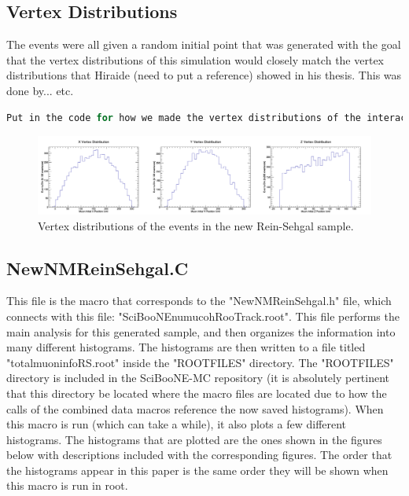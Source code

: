 \documentclass[11pt]{article}
\begin{document}
\subsection{Vertex Distributions}
The events were all given a random initial point that was generated with the goal that the vertex distributions of this simulation would closely match the vertex distributions that Hiraide (need to put a reference) showed in his thesis. This was done by... etc.

\begin{lstlisting}[language=C]
Put in the code for how we made the vertex distributions of the interactions.
\end{lstlisting}

\begin{figure}[H]
\centering
\includegraphics[width=1.0\textwidth]{EventClassifications/VertexDistributions.png}
\caption{Vertex distributions of the events in the new Rein-Sehgal sample.}
\end{figure}






\subsection{NewNMReinSehgal.C}
This file is the macro that corresponds to the "NewNMReinSehgal.h" file, which connects with this file: "SciBooNE\textunderscore numu\textunderscore coh\textunderscore RooTrack.root". This file performs the main analysis for this generated sample, and then organizes the information into many different histograms. The histograms are then written to a file titled "totalmuoninfoRS.root" inside the "ROOTFILES" directory. The "ROOTFILES" directory is included in the SciBooNE-MC repository (it is absolutely pertinent that this directory be located where the macro files are located due to how the calls of the combined data macros reference the now saved histograms). When this macro is run (which can take a while), it also plots a few different histograms. The histograms that are plotted are the ones shown in the figures below with descriptions included with the corresponding figures. The order that the histograms appear in this paper is the same order they will be shown when this macro is run in root.
\end{document}
